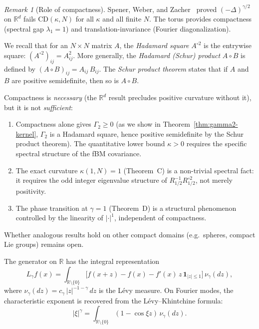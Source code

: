 \documentclass[11pt,a4paper]{article}
\theoremstyle{plain}
\theoremstyle{definition}
\theoremstyle{remark}
\newtheorem{remark}[theorem]{Remark}
\newcommand{\R}{\mathbb{R}}
\begin{document}
\begin{remark}[Role of compactness]\label{rem:compact}
Spener, Weber, and Zacher~\cite{SpenerWeberZacher2020} proved
$(-\Delta)^{\gamma/2}$ on $\R^d$ fails $\mathrm{CD}(\kappa,N)$
for all $\kappa$ and all finite $N$. The torus provides
compactness (spectral gap $\lambda_1 = 1$) and
translation-invariance (Fourier diagonalization).

We recall that for an $N \times N$ matrix $A$, the \emph{Hadamard square}
$A^{\circ 2}$ is the entrywise square: $(A^{\circ 2})_{ij} = A_{ij}^2$.
More generally, the \emph{Hadamard (Schur) product} $A \circ B$
is defined by $(A \circ B)_{ij} = A_{ij}\,B_{ij}$.
The \emph{Schur product theorem} states that if $A$ and $B$ are
positive semidefinite, then so is $A \circ B$.

Compactness is \emph{necessary} (the $\R^d$ result precludes
positive curvature without it), but it is not \emph{sufficient}:
\begin{enumerate}[label=(\roman*)]
\item Compactness alone gives $\Gamma_2 \geq 0$
  (as we show in Theorem~\ref{thm:gamma2-kernel},
  $\Gamma_2$ is a Hadamard square, hence positive semidefinite
  by the Schur product theorem).
  The quantitative lower bound $\kappa > 0$ requires the
  specific spectral structure of the fBM covariance.
\item The exact curvature $\kappa(1,N) = 1$ (Theorem~C) is
  a non-trivial spectral fact: it requires the odd integer
  eigenvalue structure of $R_{1/2}^{-1}R_{1/2}^{\circ 2}$,
  not merely positivity.
\item The phase transition at $\gamma = 1$ (Theorem~D) is a
  structural phenomenon controlled by the linearity of
  $|\cdot|^1$, independent of compactness.
\end{enumerate}
Whether analogous results hold on other compact domains
(e.g.\ spheres, compact Lie groups) remains open.
\end{remark}

The generator on $\R$ has the integral representation
\begin{equation}\label{eq:generator}
  L_\gamma f(x)
  = \int_{\R \setminus \{0\}}
  \bigl[f(x+z) - f(x) - f'(x)\,z\,\mathbf{1}_{|z| \leq 1}\bigr]
  \,\nu_\gamma(dz),
\end{equation}
where $\nu_\gamma(dz) = c_\gamma\,|z|^{-1-\gamma}\,dz$ is the
L\'evy measure.
On Fourier modes, the characteristic exponent is recovered from
the L\'evy--Khintchine formula:
\begin{equation}\label{eq:LK}
  |\xi|^\gamma
  = \int_{\R \setminus \{0\}}
  (1 - \cos \xi z)\,\nu_\gamma(dz).
\end{equation}
\end{document}
